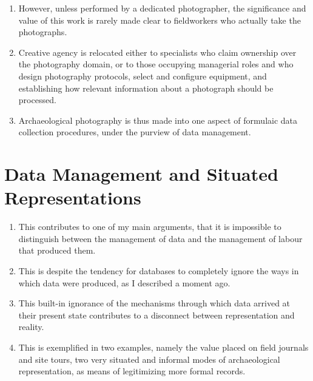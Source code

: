 \documentclass[12pt]{article}
\begin{document}
\begin{enumerate}
  \item However, unless performed by a dedicated photographer, the significance and value of this work is rarely made clear to fieldworkers who actually take the photographs.
  \item Creative agency is relocated either to specialists who claim ownership over the photography domain, or to those occupying managerial roles and who design photography protocols, select and configure equipment, and establishing how relevant information about a photograph should be processed.
  \item Archaeological photography is thus made into one aspect of formulaic data collection procedures, under the purview of data management.
\end{enumerate}

\section{Data Management and Situated Representations}
\begin{enumerate}
  \item This contributes to one of my main arguments, that it is impossible to distinguish between the management of data and the management of labour that produced them.
  \item This is despite the tendency for databases to completely ignore the ways in which data were produced, as I described a moment ago.
  \item This built-in ignorance of the mechanisms through which data arrived at their present state contributes to a disconnect between representation and reality.
  \item This is exemplified in two examples, namely the value placed on field journals and site tours, two very situated and informal modes of archaeological representation, as means of legitimizing more formal records.
\end{enumerate}
\end{document}
